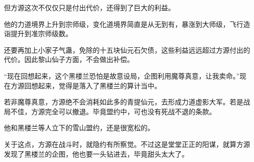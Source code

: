 \begin{this_body}
但方源这次不仅仅只是付出代价，还得到了巨大的利益。

他的力道境界上升到宗师级，变化道境界简直是从无到有，暴涨到大师级，飞行造诣提升到准宗师级数。

还要再加上小家子气蛊，免除的十五块仙元石欠债，这些利益远远超过方源付出的代价。因此黎山仙子方面，不会做出补偿。

“现在回想起来，这个黑楼兰恐怕是故意设局，企图利用魔尊真意，让我卖命。”现在方源回想起来，觉得是落入了黑楼兰的算计当中。

若非魔尊真意，方源绝不会消耗如此多的青提仙元，去形成力道虚影大军。若是战局不佳，方源完全可以撤退。毕竟盟约中，可也没有死战不退的条款。

他和黑楼兰等人立下的雪山盟约，还是很宽松的。

关于这点，方源在战斗时，就隐约有所察觉。不过这是堂堂正正的阳谋，就算方源发现了黑楼兰的企图，他也要一头钻进去，毕竟甜头太大了。

\end{this_body}

